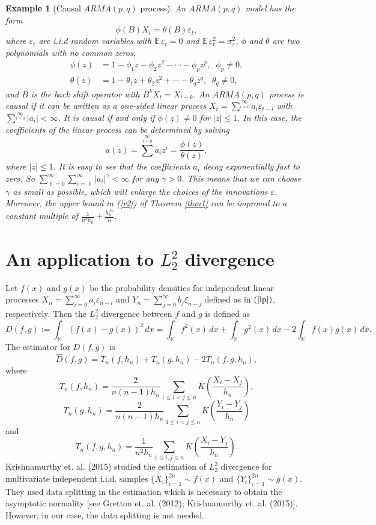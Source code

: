 \documentclass[11pt]{article}
\newtheorem{example}{Example}[section]
\def\R{{\mathbb R}}
\def\E{{{\mathbb E}\,}}
\begin{document}
\begin{example}[Causal $ARMA(p, q)$ process]  An $ARMA(p, q)$ model has the form 
\[
\phi(B)X_t=\theta(B)\varepsilon_t,
\]
where $\varepsilon_t$ are i.i.d random variables with $\E \varepsilon_t=0$ and $\E \varepsilon^2_t=\sigma^2_{\varepsilon}$, $\phi$ and $\theta$ are two polynomials with no common zeros,
\begin{align*}
\phi(z)&=1-\phi_1 z-\phi_2 z^2-\cdots-\phi_p z^p, \;\; \phi_p\ne 0,\\
\theta(z)&=1+\theta_1 z+\theta_2 z^2+\cdots-\theta_q z^q, \;\;\theta_q\ne 0,
\end{align*}
and $B$ is the back shift operator with $B^k X_t=X_{t-k}$.
An $ARMA(p, q)$ process is causal if it can be written as a one-sided linear process $X_t=\sum^\infty\limits_{i=0} a_i\varepsilon_{t-i}$ with $\sum^\infty\limits_{i=0} |a_i|<\infty$. It is causal if and only if $\phi(z)\ne 0$ for $|z|\le 1$. In this case, the coefficients of the linear process can be determined by solving 
\[
a(z)=\sum^\infty\limits_{i=0} a_i z^i=\frac{\phi(z)}{\theta(z)},
\] 
where $|z|\le 1$.  It is easy to see that the coefficients $a_i$ decay exponentially fast to zero. So $\sum\limits^{\infty}_{\ell=0}\sum\limits^{\infty}_{i=\ell} |a_i|^{\gamma}<\infty$ for any $\gamma>0$. This means that we can choose $\gamma$ as small as possible, which will enlarge the choices of the innovations $\varepsilon$. Moreover, the upper bound in (\ref{r2}) of Theorem \ref{thm1} can be improved to a constant multiple of $\frac{1}{n^2h_n}+\frac{h^{2\gamma}_n}{n}$.

\end{example}


\bigskip

\section{An application to $L^2_2$ divergence}\label{application}

Let $f(x)$ and $g(x)$ be the probability densities for independent linear processes $X_n=\sum\limits_{i=0}^\infty a_i \varepsilon_{n-i}$ and $Y_n=\sum\limits_{j=0}^\infty b_j\xi_{n-j}$ defined as in $(\ref{lp})$, respectively. Then the $L_2^2$ divergence between $f$ and $g$ is defined as 
\[
D(f,g):=\int_{\R} (f(x)-g(x))^2\, dx=\int_{\R} f^2(x)\, dx+\int_{\R} g^2(x)\, dx-2\int_{\R} f(x)g(x)\, dx.
\]
The estimator for $D(f,g)$ is 
\[
\widehat{D}(f,g)=T_n(f, h_n)+T_n(g, h_n)-2T_n(f, g, h_n),
\] 
where 
\[
T_n(f, h_n)=\frac{2}{n(n-1)h_n} \sum_{1\le i<j\le n}K\left(\frac{X_i-X_j}{h_n}\right),
\]
\[
T_n(g, h_n)=\frac{2}{n(n-1)h_n} \sum_{1\le i<j\le n}K\left(\frac{Y_i-Y_j}{h_n}\right)
\]
and 
\[
T_n(f, g, h_n)=\frac{1}{n^2h_n} \sum_{1\le i, j\le n}K\left(\frac{X_i-Y_j}{h_n}\right).
\]
Krishnamurthy et. al. (2015) studied the estimation of $L_2^2$ divergence for multivariate independent i.i.d. samples $\{X_i\}_{i=1}^{2n}\sim f(x)$ and $\{Y_i\}_{i=1}^{2n}\sim g(x)$. They used data splitting in the estimation which is necessary to obtain the asymptotic normality [see Gretton et. al. (2012);  Krishnamurthy et. al. (2015)].  However, in our case, the data splitting is not needed. 
\end{document}
